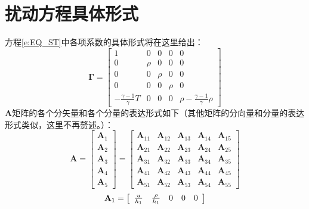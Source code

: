 \chapter{扰动方程具体形式}\label{app:SE}
方程\ref{e:EQ_ST}中各项系数的具体形式将在这里给出：
\begin{equation*}
  \mathbf{\Gamma}=\left[
  \begin{array}{ccccc}
    1 & 0 & 0 & 0 & 0 \\
    0 & \rho & 0 & 0 & 0 \\
    0 & 0 & \rho & 0 & 0 \\
    0 & 0 & 0 & \rho & 0 \\
    { - \frac{{\gamma  - 1}}{\gamma }T}& 0 & 0 & 0 & {\rho  - \frac{{\gamma  - 1}}{\gamma }\rho }
  \end{array}
  \right]
\end{equation*}
$\mathbf{A}$矩阵的各个分矢量和各个分量的表达形式如下（其他矩阵的分向量和分量的表达形式类似，这里不再赘述。）：
\begin{equation*}
  \mathbf{A}=\left[
  \begin{array}{c}
    \mathbf{A}_1 \\
    \mathbf{A}_2 \\
    \mathbf{A}_3 \\
    \mathbf{A}_4 \\
    \mathbf{A}_5
  \end{array}
  \right]=\left[
  \begin{array}{ccccc}
    \mathbf{A}_{11} & \mathbf{A}_{12} & \mathbf{A}_{13} & \mathbf{A}_{14} & \mathbf{A}_{15} \\
    \mathbf{A}_{21} & \mathbf{A}_{22} & \mathbf{A}_{23} & \mathbf{A}_{24} & \mathbf{A}_{25} \\
    \mathbf{A}_{31} & \mathbf{A}_{32} & \mathbf{A}_{33} & \mathbf{A}_{34} & \mathbf{A}_{35} \\
    \mathbf{A}_{41} & \mathbf{A}_{42} & \mathbf{A}_{43} & \mathbf{A}_{44} & \mathbf{A}_{45} \\
    \mathbf{A}_{51} & \mathbf{A}_{52} & \mathbf{A}_{53} & \mathbf{A}_{54} & \mathbf{A}_{55} 
  \end{array}\right]
\end{equation*}
\begin{equation*}
  {\bf{A}}_1  = \left[ {\begin{array}{*{20}c}
   {\frac{u}{{h_1 }}} & {\frac{\rho }{{h_1 }}} & 0 & 0 & 0  \\
\end{array}} \right]
\end{equation*}
